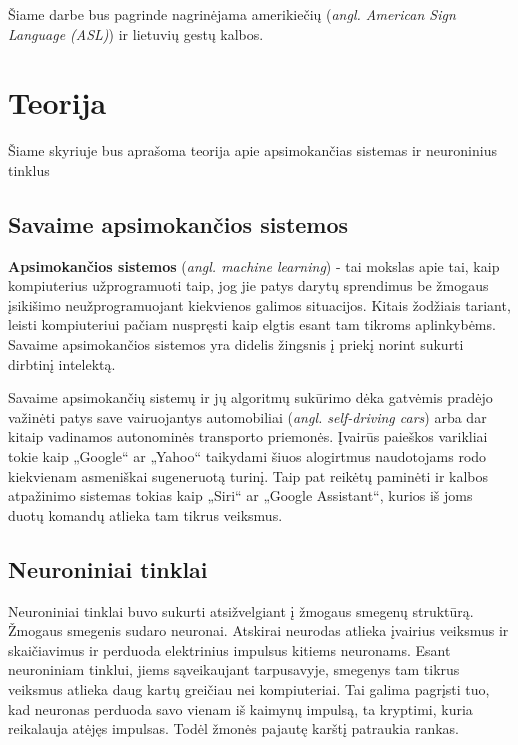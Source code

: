\documentclass{VUMIFInfKursinis}
\begin{document}
Šiame darbe bus pagrinde nagrinėjama amerikiečių (\textit{angl. American Sign Language (ASL)}) ir lietuvių gestų kalbos.

\section{Teorija}
Šiame skyriuje bus aprašoma teorija apie apsimokančias sistemas ir neuroninius tinklus

\subsection{Savaime apsimokančios sistemos}
\textbf{Apsimokančios sistemos} (\textit{angl. machine learning}) - tai mokslas apie tai, kaip kompiuterius užprogramuoti taip, jog jie patys darytų sprendimus be žmogaus įsikišimo neužprogramuojant kiekvienos galimos situacijos. Kitais žodžiais tariant, leisti kompiuteriui pačiam nuspręsti kaip elgtis esant tam tikroms aplinkybėms. Savaime apsimokančios sistemos yra didelis žingsnis į priekį norint sukurti dirbtinį intelektą.

Savaime apsimokančių sistemų ir jų algoritmų sukūrimo dėka gatvėmis pradėjo važinėti patys save vairuojantys automobiliai (\textit{angl. self-driving cars}) arba dar kitaip vadinamos autonominės transporto priemonės. Įvairūs paieškos varikliai tokie kaip „Google“ ar „Yahoo“ taikydami šiuos alogirtmus naudotojams rodo kiekvienam asmeniškai sugeneruotą turinį. Taip pat reikėtų paminėti ir kalbos atpažinimo sistemas tokias kaip „Siri“ ar „Google Assistant“, kurios iš joms duotų komandų atlieka tam tikrus veiksmus.

\subsection{Neuroniniai tinklai}
Neuroniniai tinklai buvo sukurti atsižvelgiant į žmogaus smegenų struktūrą. Žmogaus smegenis sudaro neuronai. Atskirai neurodas atlieka įvairius veiksmus ir skaičiavimus ir perduoda elektrinius impulsus kitiems neuronams. Esant neuroniniam tinklui, jiems sąveikaujant tarpusavyje, smegenys tam tikrus veiksmus atlieka daug kartų greičiau nei kompiuteriai. Tai galima pagrįsti tuo, kad neuronas perduoda savo vienam iš kaimynų impulsą, ta kryptimi, kuria reikalauja atėjęs impulsas. Todėl žmonės pajautę karštį patraukia rankas.
\end{document}
